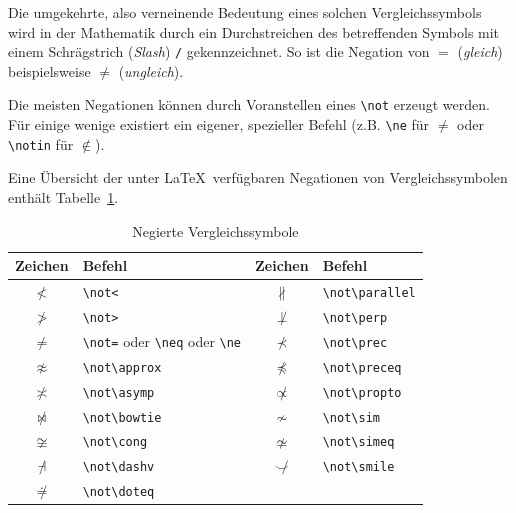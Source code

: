 \documentclass[a4paper,10pt,twoside]{scrbook}
\begin{document}
{Die umgekehrte, also verneinende
Bedeutung eines solchen Vergleichssymbols wird
in der Mathematik durch ein Durchstreichen des betreffenden Symbols mit einem Schrägstrich (\textsl{Slash})
\verb!/! gekennzeichnet. So ist die Negation von \(=\) (\textsl{gleich}) 
beispielsweise \(\neq\) (\textsl{ungleich}).


Die meisten Negationen können durch Voranstellen eines 
\verb!\not!
 erzeugt werden. Für einige wenige existiert ein eigener,
spezieller Befehl (z.B. \verb!\ne! für \(\ne\) oder 
\verb!\notin!
 für \(\notin\)).

Eine Übersicht der unter \LaTeX\ verfügbaren 
Negationen von Vergleichssymbolen enthält Tabelle~\ref{Tabelle_NegierteVergleichssymbole}.


\begin{table}[h!tb]
\centering
\caption{Negierte Vergleichssymbole}
\label{Tabelle_NegierteVergleichssymbole}       %
\begin{tabular}{clcl}
\hline
Zeichen & Befehl & Zeichen & Befehl  \\
\hline
$\not<$ & \texttt{\textbackslash not<} & 
$\not\parallel$ & \texttt{\textbackslash not\textbackslash parallel}\\
$\not>$ & \texttt{\textbackslash not>} & 
$\not\perp$ & \texttt{\textbackslash not\textbackslash perp} \\
$\not=$ & \texttt{\textbackslash not=} oder \texttt{\textbackslash neq} oder \texttt{\textbackslash ne}&
$\not\prec$ & \texttt{\textbackslash not\textbackslash prec} \\
$\not\approx$ & \texttt{\textbackslash not\textbackslash approx} & 
$\not\preceq$ & \texttt{\textbackslash not\textbackslash preceq} \\
$\not\asymp$ & \texttt{\textbackslash not\textbackslash asymp} & 
$\not\propto$ & \texttt{\textbackslash not\textbackslash propto} \\
$\not\bowtie$ & \texttt{\textbackslash not\textbackslash bowtie} & 
$\not\sim$ & \texttt{\textbackslash not\textbackslash sim} \\
$\not\cong$ & \texttt{\textbackslash not\textbackslash cong} & 
$\not\simeq$ & \texttt{\textbackslash not\textbackslash simeq} \\
$\not\dashv$ & \texttt{\textbackslash not\textbackslash dashv} & 
$\not\smile$ & \texttt{\textbackslash not\textbackslash smile} \\
$\not\doteq$ & \texttt{\textbackslash not\textbackslash doteq} & 

\end{tabular}
\end{table}}
\end{document}

